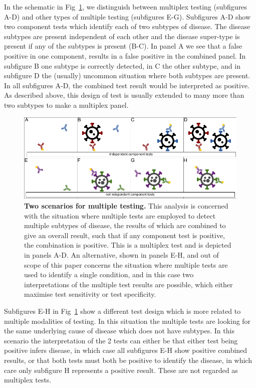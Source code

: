 \documentclass[10pt,letterpaper]{article}
\begin{document}
In the schematic in Fig~\ref{fig1}, we distinguish between multiplex testing (subfigures A-D) and other types of multiple testing (subfigures E-G). Subfigures A-D show two component tests which identify each of two subtypes of disease. The disease subtypes are present independent of each other and the disease super-type is present if any of the subtypes is present (B-C). In panel A we see that a false positive in one component, results in a false positive in the combined panel. In subfigure B one subtype is correctly detected, in C the other subtype, and in subfigure D the (usually) uncommon situation where both subtypes are present. In all subfigures A-D, the combined test result would be interpreted as positive. As described above, this design of test is usually extended to many more than two subtypes to make a multiplex panel.


\begin{figure}[!h]
\centerline{\includegraphics{fig/fig1-testerror.pdf}}
\caption{{\bf Two scenarios for multiple testing.}
This analysis is concerned with the situation where multiple tests are employed to detect multiple subtypes of disease, the results of which are combined to give an overall result, such that if any component test is positive, the combination is positive. This is a multiplex test and is depicted in panels A-D. An alternative, shown in panels E-H, and out of scope of this paper concerns the situation where multiple tests are used to identify a single condition, and in this case two interpretations of the multiple test results are possible, which either maximise test sensitivity or test specificity.}
\label{fig1}
\end{figure}

Subfigures E-H in Fig~\ref{fig1} show a different test design which is more related to multiple modalities of testing\cite{weinstein2005}. In this situation the multiple tests are looking for the same underlying cause of disease which does not have subtypes. In this scenario the interpretation of the 2 tests can either be that either test being positive infers disease, in which case all subfigures E-H show positive combined results, or that both tests must both be positive to identify the disease, in which care only subfigure H represents a positive result. These are not regarded as multiplex tests.
\end{document}
